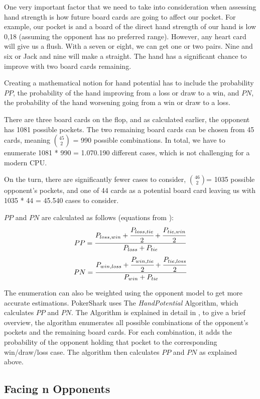 One very important factor that we need to take into consideration when assessing hand strength is how future board cards are going to affect our pocket. For example, our pocket is  and a board of  the direct hand strength of our hand is low 0,18 (assuming the opponent has no preferred range). However, any heart card will give us a flush. With a seven or eight, we can get one or two pairs. Nine and six or Jack and nine will make a straight. The hand has a significant chance to improve with two board cards remaining.

Creating a mathematical notion for hand potential has to include the probability $PP$, the probability of the hand improving from a loss or draw to a win, and $PN$, the probability of the hand worsening going from a win or draw to a loss.

There are three board cards on the flop, and as calculated earlier, the opponent has 1081 possible pockets. The two remaining board cards can be chosen from 45 cards, meaning ${45 \choose 2}$ = 990 possible combinations. In total, we have to enumerate 1081 * 990 = 1.070.190 different cases, which is not challenging for a modern CPU.

On the turn, there are significantly fewer cases to consider, ${46 \choose 2}$=  1035 possible opponent's pockets, and one of 44 cards as a potential board card leaving us with 1035 * 44 = 45.540 cases to consider.

$PP$ and $PN$ are calculated as follows (equations from \cite{papp_dealing_1998}):
$$PP =\frac{P_{loss,win} + \cfrac{P_{loss,tie}}{2} + \cfrac{P_{tie,win}}{2}}{P_{loss} + P_{tie}}$$
$$PN =\frac{P_{win,loss} + \cfrac{P_{win,tie}}{2} + \cfrac{P_{tie,loss}}{2}}{P_{win} + P_{tie}}$$

The enumeration can also be weighted using the opponent model to get more accurate estimations. PokerShark uses The \textit{HandPotential} Algorithm, which calculates $PP$ and $PN$. The Algorithm is explained in detail in \cite{papp_dealing_1998}, to give a brief overview, the algorithm enumerates all possible combinations of the opponent's pockets and the remaining board cards. For each combination, it adds the probability of the opponent holding that pocket to the corresponding win/draw/loss case. The algorithm then calculates $PP$ and $PN$ as explained above.

\subsection{Facing n Opponents}

